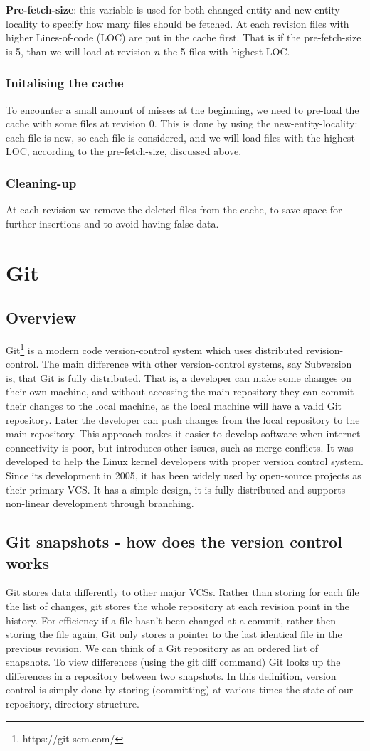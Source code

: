 \documentclass[12pt,twoside,notitlepage]{report}
\begin{document}
\textbf{Pre-fetch-size}: this variable is used for both changed-entity and new-entity locality to specify how many files should be fetched. At each revision files with higher Lines-of-code (LOC) are put in the cache first. That is if the pre-fetch-size is 5, than we will load at revision $n$ the 5 files with highest LOC.

\subsubsection{Initalising the cache}
To encounter a small amount of misses at the beginning, we need to pre-load the cache with some files at revision $0$. This is done by using the new-entity-locality: each file is new, so each file is considered, and we will load files with the highest LOC, according to the pre-fetch-size, discussed above.
\subsubsection{Cleaning-up}
At each revision we remove the deleted files from the cache, to save space for further insertions and to avoid having false data.
\section{Git}
\subsection{Overview}
Git\footnote{https://git-scm.com/} is a modern code version-control system which uses distributed revision-control. The main difference with other version-control systems, say Subversion is, that Git is fully distributed. That is, a developer can make some changes on their own machine, and without accessing the main repository they can commit their changes to the local machine, as the local machine will have a valid Git repository. Later the developer can push changes from the local repository to the main repository. This approach makes it easier to develop software when internet connectivity is poor, but introduces other issues, such as merge-conflicts. It was developed to help the Linux kernel developers with proper version control system. Since its development in 2005, it has been widely used by open-source projects as their primary VCS. It has a simple design, it is fully distributed and supports non-linear development through branching.
\subsection{Git snapshots - how does the version control works}
Git stores data differently to other major VCSs. Rather than storing for each file the list of changes, git stores the whole repository at each revision point in the history. For efficiency if a file hasn't been changed at a commit, rather then storing the file again, Git only stores a pointer to the last identical file in the previous revision. We can think of a Git repository as an ordered list of snapshots. To view differences (using the git diff command) Git looks up the differences in a repository between two snapshots. In this definition, version control is simply done by storing (committing) at various times the state of our repository, directory structure.
\end{document}
